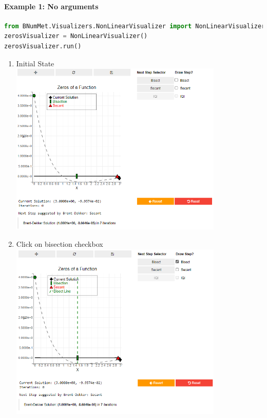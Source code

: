 \paragraph{Example 1: No arguments}
\begin{lstlisting}[language=Python]
from BNumMet.Visualizers.NonLinearVisualizer import NonLinearVisualizer
zerosVisualizer = NonLinearVisualizer()
zerosVisualizer.run()
\end{lstlisting}
\begin{enumerate}
    \item Initial State\\
    \includegraphics[width=0.8\textwidth]{Include/Images/Thesis/Documentation/Visualizers/NonLinear/Example 1/Example 1 - 00 - Initial State.png}
    \item Click on bisection checkbox\\
    \includegraphics[width=0.8\textwidth]{Include/Images/Thesis/Documentation/Visualizers/NonLinear/Example 1/Example 1 - 01 - Bisection Checkbox.png}

\end{enumerate}
